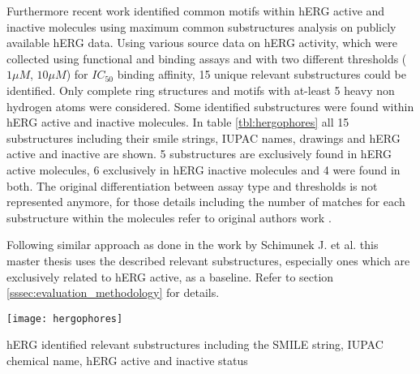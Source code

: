 \documentclass[../main.tex]{subfiles}
\begin{document}
Furthermore recent work \cite{czodrowski_herg_2013} identified common motifs within hERG active and inactive molecules using maximum common substructures analysis on publicly available hERG data. Using various source data on hERG activity, which were collected using functional and binding assays and with two different thresholds ($1 \mu M$, $10 \mu M$) for $IC_{50}$ binding affinity, 15 unique relevant substructures could be identified. Only complete ring structures and motifs with at-least 5 heavy non hydrogen atoms were considered. Some identified substructures were found within hERG active and inactive molecules. 
In table \ref{tbl:hergophores} all 15 substructures including their smile strings, IUPAC names, drawings and hERG active and inactive are shown. 5 substructures are exclusively found in hERG active molecules, 6 exclusively in hERG inactive molecules and 4 were found in both. The original differentiation between assay type and thresholds is not represented anymore, for those details including the number of matches for each substructure within the molecules refer to original authors work \cite{czodrowski_herg_2013}. 
\newline

Following similar approach as done in the work by Schimunek J. et al. \cite{schimunek_poster_2021} this master thesis uses the described relevant substructures, especially ones which are exclusively related to hERG active, as a baseline. Refer to section \ref{sssec:evaluation_methodology} for details.

\begin{table}[H]
	\centering
	\texttt{[image: hergophores]}
	\caption{hERG identified relevant substructures including the SMILE string, IUPAC chemical name, hERG active and inactive status \cite{czodrowski_herg_2013}}
 	\label{tbl:hergophores}	
\end{table}
     
\end{document}
